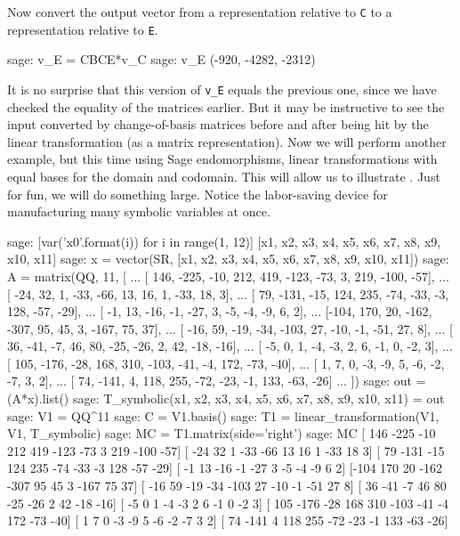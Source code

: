 %
Now convert the output vector from a representation relative to \verb?C? to a representation relative to \verb?E?.
%
\begin{sageexample}
sage: v_E = CBCE*v_C
sage: v_E
(-920, -4282, -2312)
\end{sageexample}
%
It is no surprise that this version of \verb?v_E? equals the previous one, since we have checked the equality of the matrices earlier.  But it may be instructive to see the input converted by change-of-basis matrices before and after being hit by the linear transformation (as a matrix representation).
%
Now we will perform another example, but this time using Sage endomorphisms, linear transformations with equal bases for the domain and codomain.  This will allow us to illustrate .  Just for fun, we will do something large. Notice the labor-saving device for manufacturing many symbolic variables at once.
%
\begin{sageexample}
sage: [var('x{0}'.format(i)) for i in range(1, 12)]
[x1, x2, x3, x4, x5, x6, x7, x8, x9, x10, x11]
sage: x = vector(SR, [x1, x2, x3, x4, x5, x6, x7, x8, x9, x10, x11])
sage: A = matrix(QQ, 11, [
...   [ 146, -225, -10,  212,  419, -123, -73,  3,  219, -100, -57],
...   [ -24,   32,   1,  -33,  -66,   13,  16,  1,  -33,   18,   3],
...   [  79, -131, -15,  124,  235,  -74, -33, -3,  128,  -57, -29],
...   [  -1,   13, -16,   -1,  -27,    3,  -5, -4,   -9,    6,   2],
...   [-104,  170,  20, -162, -307,   95,  45,  3, -167,   75,  37],
...   [ -16,   59, -19,  -34, -103,   27, -10, -1,  -51,   27,   8],
...   [  36,  -41,  -7,   46,   80,  -25, -26,  2,   42,  -18, -16],
...   [  -5,    0,   1,   -4,   -3,    2,   6, -1,    0,   -2,   3],
...   [ 105, -176, -28,  168,  310, -103, -41, -4,  172,  -73, -40],
...   [   1,    7,   0,   -3,   -9,    5,  -6, -2,   -7,    3,   2],
...   [  74, -141,   4,  118,  255,  -72, -23, -1,  133,  -63, -26]
...                      ])
sage: out = (A*x).list()
sage: T_symbolic(x1, x2, x3, x4, x5, x6, x7, x8, x9, x10, x11) = out
sage: V1 = QQ^11
sage: C = V1.basis()
sage: T1 = linear_transformation(V1, V1, T_symbolic)
sage: MC = T1.matrix(side='right')
sage: MC
[ 146 -225  -10  212  419 -123  -73    3  219 -100  -57]
[ -24   32    1  -33  -66   13   16    1  -33   18    3]
[  79 -131  -15  124  235  -74  -33   -3  128  -57  -29]
[  -1   13  -16   -1  -27    3   -5   -4   -9    6    2]
[-104  170   20 -162 -307   95   45    3 -167   75   37]
[ -16   59  -19  -34 -103   27  -10   -1  -51   27    8]
[  36  -41   -7   46   80  -25  -26    2   42  -18  -16]
[  -5    0    1   -4   -3    2    6   -1    0   -2    3]
[ 105 -176  -28  168  310 -103  -41   -4  172  -73  -40]
[   1    7    0   -3   -9    5   -6   -2   -7    3    2]
[  74 -141    4  118  255  -72  -23   -1  133  -63  -26]
\end{sageexample}
